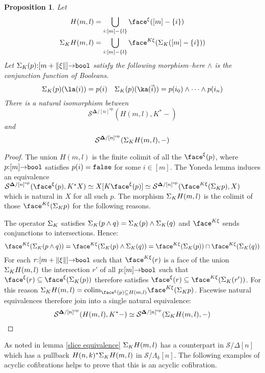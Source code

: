 \documentclass{amsart}
\theoremstyle{plain}
\newtheorem{prop}[theorem]{Proposition}
\theoremstyle{definition}
\newcommand\cat\mathcal
\newcommand\set[1]{\left\{#1\right\}}
\newcommand\ri{^*}
\newcommand\dual{^{\mathrm{op}}}
\newcommand\simCat{\mathbf\Delta}
\newcommand\of{\mathord:}
\renewcommand\to{\mathord\rightarrow}
\newcommand\simplex\Delta
\newcommand\horn\Lambda
\begin{document}
\begin{prop} Let
\begin{align*}
H(m,l)&=\bigcup_{i\of [m]-\set l} \face^\xi([m]-\set i)\\
\depsum KH(m,l)&=\bigcup_{i\of [m]-\set l} \face^{K\xi}(\depsum K([m]-\set i))
\end{align*}
Let $\depsum K(p)\of [m+\norm\xi]\to \bool$ satisfy the following morphism--here $\mathord\land$ is the conjunction function of Booleans.
\[ \depsum K(p)(\la(i))=p(i)\quad\depsum K(p)(\ka(\vec i)) = p(i_0)\land\dotsm\land p(i_n) \] 
There is a natural isomorphism between
\[ \cat S^{\simCat/[n]\dual}(H(m,l),K\ri -) \] and 
\[ \cat S^{\simCat/[n]\dual}(\depsum KH(m,l),-) \] \label{K-universal}
\end{prop}

\newcommand\colim{\mathrm{colim}}
\begin{proof} The union $H(m,l)$ is the finite colimit of all the $\face^\xi(p)$, where $p\of[m]\to\bool$ satisfies $p(i)=\mathtt{false}$ for some $i\in [m]$. The Yoneda lemma induces an equivalence $\cat S^{\simCat/[n]\dual}(\face^\xi(p),K\ri X)\simeq X[K\face^\xi(p)]\simeq \cat S^{\simCat/[n]\dual}(\face^{K\xi}(\depsum K p),X)$ which is natural in $X$ for all such $p$. The morphism $\Sigma_{K}H(m,l)$ is the colimit of those $\face^{K\xi}(\depsum K p)$ for the following reasons.

The operator $\Sigma_{K}$ satisfies $\Sigma_{K}(p\land q)=\Sigma_{K}(p)\land \Sigma_{K}(q)$ and $\face^{K\xi}$ sends conjunctions to intersections. Hence:
\[ \face^{K\xi}(\depsum K(p\land q)) = \face^{K\xi}(\depsum K(p)\land \depsum K(q)) = \face^{K\xi}(\depsum K(p))\cap \face^{K\xi}(\depsum K(q)) \]
For each $r\of[m+\norm\xi]\to \bool$ such that $\face^{K\xi}(r)$ is a face of the union $\Sigma_{K}H(m,l)$ the intersection $r'$ of all $p\of[m]\to \bool$ such that $\face^\xi(r)\subseteq\face^\xi(\depsum K(p))$ therefore satisfies $\face^\xi(r)\subseteq \face^{K\xi}(\depsum K(r'))$. For this reason $\depsum KH(m,l)=\colim_{\face^\xi(p)\subseteq H(m,l)}\face^{K\xi}(\depsum K p)$. Facewise natural equivalences therefore join into a single natural equivalence:
\[ \cat S^{\simCat/[n]\dual}(H(m,l),K\ri -)\simeq\cat S^{\simCat/[n]\dual}(\depsum K H(m,l), -) \]
\end{proof}

As noted in lemma \ref{slice equivalence} $\Sigma_{K} H(m,l)$ has a counterpart in $\cat S/\simplex[n]$ which has a pullback $H(n,k)\ri \depsum K H(m,l)$ in $\cat S/\horn_k[n]$. The following examples of acyclic cofibrations helps to prove that this is an acyclic cofibration.
\end{document}
